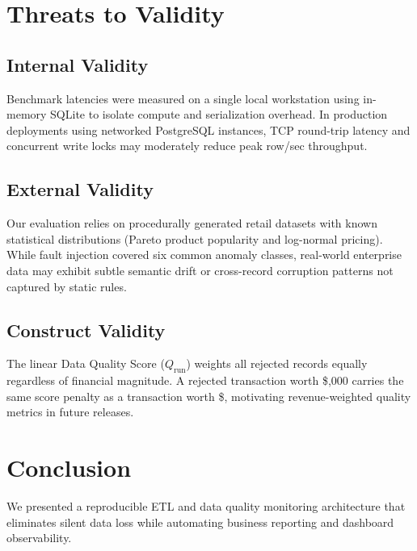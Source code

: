\documentclass[conference]{IEEEtran}
\begin{document}
\section{Threats to Validity}
\subsection{Internal Validity}
Benchmark latencies were measured on a single local workstation using in-memory SQLite to isolate compute and serialization overhead. In production deployments using networked PostgreSQL instances, TCP round-trip latency and concurrent write locks may moderately reduce peak row/sec throughput.

\subsection{External Validity}
Our evaluation relies on procedurally generated retail datasets with known statistical distributions (Pareto product popularity and log-normal pricing). While fault injection covered six common anomaly classes, real-world enterprise data may exhibit subtle semantic drift or cross-record corruption patterns not captured by static rules.

\subsection{Construct Validity}
The linear Data Quality Score ($Q_{\text{run}}$) weights all rejected records equally regardless of financial magnitude. A rejected transaction worth \$\1,000 carries the same score penalty as a transaction worth \$, motivating revenue-weighted quality metrics in future releases.

\section{Conclusion}
We presented a reproducible ETL and data quality monitoring architecture that eliminates silent data loss while automating business reporting and dashboard observability.



\end{document}
